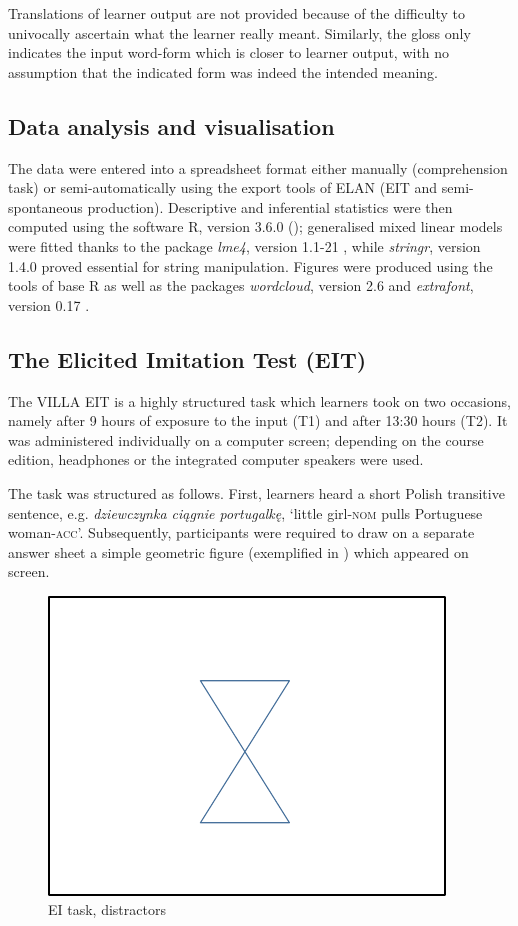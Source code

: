 Translations of learner output are not provided because of the difficulty to univocally ascertain what the learner really meant. Similarly, the gloss only indicates the input word-form which is closer to learner output, with no assumption that the indicated form was indeed the intended meaning.

\subsection{Data analysis and visualisation}\label{sec:02:4.2}

The data were entered into a spreadsheet format either manually (comprehension task) or semi-automatically using the export tools of ELAN (EIT and semi-spontaneous production). Descriptive and inferential statistics were then computed using the software R, version 3.6.0 (\citealt{RCoreTeam2017}); generalised mixed linear models were fitted thanks to the package \textit{lme4}, version 1.1-21 \citep{BatesEtAl2015}, while \textit{stringr}, version 1.4.0 \citep{Wickham2017} proved essential for string manipulation. Figures were produced using the tools of base R as well as the packages \textit{wordcloud}, version 2.6 \citep{Fellows2014} and \textit{extrafont}, version 0.17 \citep{Chang2014}. 

\subsection{The Elicited Imitation Test (EIT)}\label{sec:02:4.3}

The VILLA EIT is a highly structured task which learners took on two occasions, namely after 9 hours of exposure to the input (T1) and after 13:30 hours (T2). It was administered individually on a computer screen; depending on the course edition, headphones or the integrated computer speakers were used. 

The task was structured as follows. First, learners heard a short Polish transitive sentence, e.g. \textit{dziewczynka ciągnie portugalkę}, ‘little girl-\textsc{nom} pulls Portuguese woman-\textsc{acc}’. Subsequently, participants were required to draw on a separate answer sheet a simple geometric figure (exemplified in ) which appeared on screen.

\begin{figure}
    \includegraphics[height=.3\textheight]{figures/02-6.pdf}
    \caption{EI task, distractors}
    \label{fig:02:6}
\end{figure} 

